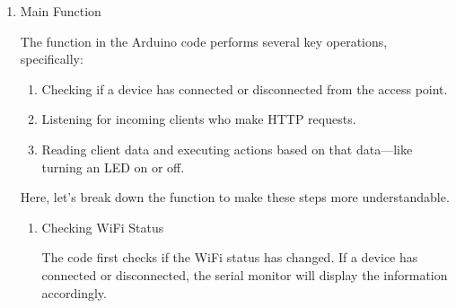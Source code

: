 \documentclass[a4paper,11pt,english]{sphinxmanual}
\begin{document}
\begin{enumerate}
%
\item {} 
\sphinxAtStartPar
Main  Function

\sphinxAtStartPar
The  function in the Arduino code performs several key operations, specifically:
\begin{enumerate}
%
\item {} 
\sphinxAtStartPar
Checking if a device has connected or disconnected from the access point.

\item {} 
\sphinxAtStartPar
Listening for incoming clients who make HTTP requests.

\item {} 
\sphinxAtStartPar
Reading client data and executing actions based on that data—like turning an LED on or off.

\end{enumerate}

\sphinxAtStartPar
Here, let’s break down the  function to make these steps more understandable.
\begin{enumerate}
%
\item {} 
\sphinxAtStartPar
Checking WiFi Status

\sphinxAtStartPar
The code first checks if the WiFi status has changed. If a device has connected or disconnected, the serial monitor will display the information accordingly.

\begin{sphinxVerbatim}[commandchars=\\\{\}]
\end{sphinxVerbatim}


\end{enumerate}
\end{enumerate}
\end{document}

